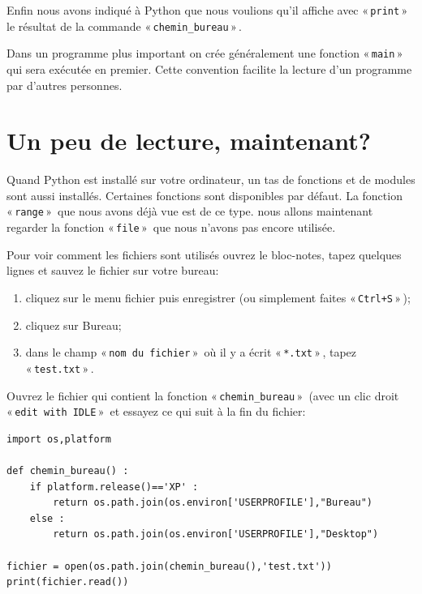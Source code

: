 Enfin nous avons indiqué à Python que nous voulions qu'il affiche avec « \texttt{print} »  le résultat de la commande « \texttt{chemin\_bureau} » .

Dans un programme plus important on crée généralement une fonction « \texttt{main} »  qui sera exécutée en premier. Cette convention facilite la lecture d'un programme par d'autres personnes.

\section{Un peu de lecture, maintenant?}
Quand Python est installé sur votre ordinateur, un tas de fonctions et de modules sont aussi installés. Certaines fonctions sont disponibles par défaut. La fonction « \texttt{range} »  que nous avons déjà vue est de ce type. nous allons maintenant regarder la fonction « \texttt{file} »  que nous n'avons pas encore utilisée.

\begin{WINDOWS}
Pour voir comment les fichiers sont utilisés ouvrez le bloc-notes, tapez quelques lignes et sauvez le fichier sur votre bureau:
\begin{enumerate}
\item cliquez sur le menu fichier puis enregistrer (ou simplement faites « \texttt{Ctrl+S} » );
\item cliquez sur Bureau;
\item dans le champ « \texttt{nom du fichier} »  où il y a écrit « \texttt{*.txt} » , tapez « \texttt{test.txt} » .
\end{enumerate}

Ouvrez le fichier qui contient la fonction « \texttt{chemin\_bureau} »  (avec un clic droit « \texttt{edit with IDLE} »  et essayez ce qui suit à la fin du fichier:
\begin{Verbatim}[frame=single,rulecolor=\color{mbleu}, label=à taper]
import os,platform

def chemin_bureau() :
    if platform.release()=='XP' :
        return os.path.join(os.environ['USERPROFILE'],"Bureau")
    else :
        return os.path.join(os.environ['USERPROFILE'],"Desktop")
    
fichier = open(os.path.join(chemin_bureau(),'test.txt'))
print(fichier.read())
\end{Verbatim}
\end{WINDOWS}


